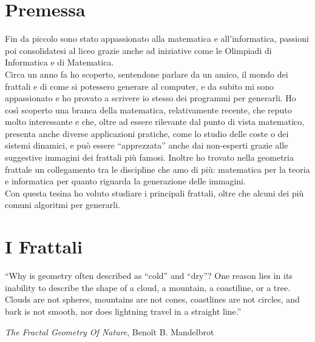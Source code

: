 \documentclass[10pt]{report}
\begin{document}
	\tableofcontents
	\newpage
	\chapter{Premessa}
		Fin da piccolo sono stato appassionato alla matematica e all'informatica, passioni poi consolidatesi al liceo grazie anche ad iniziative come le Olimpiadi di Informatica e di Matematica.\\ Circa un anno fa ho scoperto, sentendone parlare da un amico, il mondo dei frattali e di come si potessero generare al computer, e da subito mi sono appassionato e ho provato a scrivere io stesso dei programmi per generarli. Ho così scoperto una branca della matematica, relativamente recente, che reputo molto interessante e che, oltre ad essere rilevante dal punto di vista matematico, presenta anche diverse applicazioni pratiche, come lo studio delle coste o dei sistemi dinamici, e può essere ``apprezzata'' anche dai non-esperti grazie alle suggestive immagini dei frattali più famosi. Inoltre ho trovato nella geometria frattale un collegamento tra le discipline che amo di più: matematica per la teoria e informatica per quanto riguarda la generazione delle immagini.\\ Con questa tesina ho voluto studiare i principali frattali, oltre che alcuni dei più comuni algoritmi per generarli.
	\chapter{I Frattali}
		\epigraph{``Why is geometry often described as ``cold'' and ``dry''? One reason lies in its inability to describe the shape of a cloud, a mountain, a coastiline, or a tree. Clouds are not spheres, mountains are not cones, coastlines are not circles, and bark is not smooth, nor does lightning travel in a straight line.''}{\textit{The Fractal Geometry Of Nature}, Benoît B. Mandelbrot}
\end{document}
